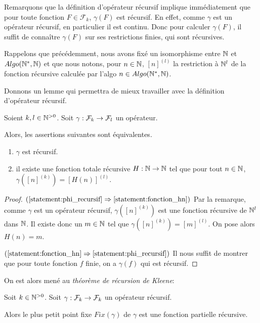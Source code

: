 Remarquons que la définition d'opérateur récursif implique immédiatement que
pour toute fonction $F \in \mathcal{F}_{k}$, $\gamma(F)$ est récursif. En effet,
comme $\gamma$ est un opérateur récursif, en particulier il est continu. Donc
pour calculer $\gamma(F)$, il suffit de connaître $\gamma(F)$ sur ses restrictions
finies, qui sont récursives.

Rappelons que précédemment, nous avons fixé un isomorphisme entre $\naturel$ et
$Algo(\naturel^{*}, \naturel)$ et que nous notons, pour $n \in \naturel$,
$[n]^{(l)}$ la restriction à $\naturel^{l}$ de la fonction récursive calculée
par l'algo $n \in Algo(\naturel^{*}, \naturel)$.

Donnons un lemme qui permettra de mieux travailler avec la définition
d'opérateur récursif.

\begin{lemma}
	Soient $k, l \in \naturel^{> 0}$.
	Soit $\GSfunction{\gamma}{\mathcal{F}_{k}}{\mathcal{F}_{l}}$ un opérateur.

	Alors, les assertions suivantes sont équivalentes.
	\begin{enumerate}
		\item \label{statement:phi_recursif} $\gamma$ est récursif.
		\item \label{statement:fonction_hn} il existe une fonction totale récursive $H : \naturel \rightarrow
			\naturel$ tel que pour tout $n \in \naturel$, $\gamma([n]^{(k)}) =
			[H(n)]^{(l)}$.
	\end{enumerate}
\end{lemma}

\ifdefined\outputproof
\begin{proof}
	$(\ref{statement:phi_recursif} \implies \ref{statement:fonction_hn})$ Par la
	remarque, comme $\gamma$ est un opérateur récursif, $\gamma([n]^{(k)})$ est une
	fonction récursive de $\naturel^{l}$ dans $\naturel$. Il existe donc un $m
	\in \naturel$ tel que $\gamma([n]^{(k)}) = [m]^{(l)}$. On pose alors $H(n) =
	m$.

	$(\ref{statement:fonction_hn} \implies \ref{statement:phi_recursif})$ Il
	nous suffit de montrer que pour toute fonction $f$ finie, on a $\gamma(f)$ qui
	est récursif.
\end{proof}
\fi

On est alors mené au \textit{théorème de récursion de Kleene}:

\begin{theorem} 
	\label{theorem:kleene_recursion}
	Soit $k \in \naturel^{> 0}$.
	Soit $\GSfunction{\gamma}{\mathcal{F}_{k}}{\mathcal{F}_{k}}$ un opérateur
	récursif.

	Alors le plus petit point fixe $Fix(\gamma)$ de $\gamma$ est une fonction partielle récursive.
\end{theorem}

